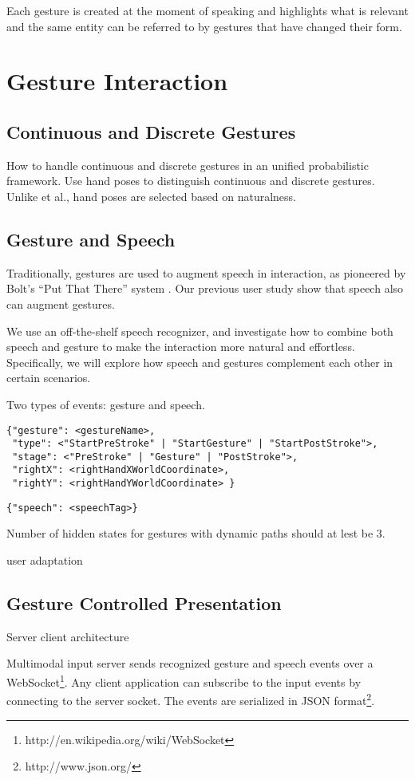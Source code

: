 \begin{savequote}[120mm]
Each gesture is created at the moment of speaking and highlights what is
relevant and the same entity can be referred to by gestures that have changed
their form.
\end{savequote}
\chapter{Gesture Interaction}
\section{Continuous and Discrete Gestures}
How to handle continuous and discrete gestures in an unified probabilistic
framework. Use hand poses to distinguish continuous and discrete gestures.
Unlike \cite{Oka02} et al., hand poses are selected based on naturalness.

\section{Gesture and Speech}
Traditionally, gestures are used to augment speech in interaction, as pioneered
by Bolt's ``Put That There'' system \cite{Bolt80}. Our previous user study
\cite{yin10thesis} show that speech also can augment gestures.

We use an off-the-shelf speech 
recognizer, and investigate how to combine both speech and gesture to make
the interaction more natural and effortless. Specifically, we will explore how speech and gestures complement each other in certain scenarios.

Two types of events: gesture and speech.

\begin{lstlisting}[caption=Gesture event JSON object]
{"gesture": <gestureName>, 
 "type": <"StartPreStroke" | "StartGesture" | "StartPostStroke">,
 "stage": <"PreStroke" | "Gesture" | "PostStroke">,
 "rightX": <rightHandXWorldCoordinate>,
 "rightY": <rightHandYWorldCoordinate> } 
\end{lstlisting}

\begin{lstlisting}[caption=Speech event JSON object]
{"speech": <speechTag>}
\end{lstlisting}

Number of hidden states for gestures with dynamic paths should at lest be 3.

user adaptation
\section{Gesture Controlled Presentation}
Server client architecture

Multimodal input server sends recognized gesture and speech events over a
WebSocket\footnote{http://en.wikipedia.org/wiki/WebSocket}. Any client
application can subscribe to the input events by connecting to the server
socket. The events are serialized in JSON format\footnote{http://www.json.org/}. 
